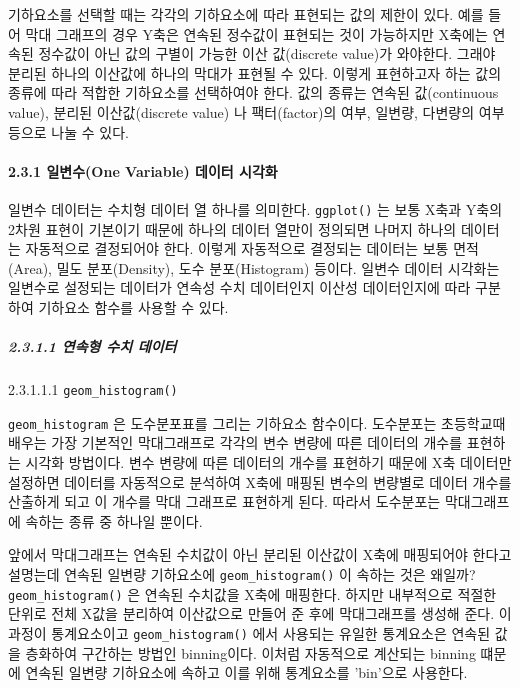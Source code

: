 \documentclass[
]{article}
\begin{document}
기하요소를 선택할 때는 각각의 기하요소에 따라 표현되는 값의 제한이 있다. 예를 들어 막대 그래프의 경우 Y축은 연속된 정수값이 표현되는 것이 가능하지만 X축에는 연속된 정수값이 아닌 값의 구별이 가능한 이산 값(discrete value)가 와야한다. 그래야 분리된 하나의 이산값에 하나의 막대가 표현될 수 있다. 이렇게 표현하고자 하는 값의 종류에 따라 적합한 기하요소를 선택하여야 한다. 값의 종류는 연속된 값(continuous value), 분리된 이산값(discrete value) 나 팩터(factor)의 여부, 일변량, 다변량의 여부 등으로 나눌 수 있다.

\hypertarget{uxc77cuxbcc0uxc218one-variable-uxb370uxc774uxd130-uxc2dcuxac01uxd654}{%
\paragraph{2.3.1 일변수(One Variable) 데이터 시각화}\label{uxc77cuxbcc0uxc218one-variable-uxb370uxc774uxd130-uxc2dcuxac01uxd654}}

일변수 데이터는 수치형 데이터 열 하나를 의미한다. \texttt{ggplot()} 는 보통 X축과 Y축의 2차원 표현이 기본이기 때문에 하나의 데이터 열만이 정의되면 나머지 하나의 데이터는 자동적으로 결정되어야 한다. 이렇게 자동적으로 결정되는 데이터는 보통 면적(Area), 밀도 분포(Density), 도수 분포(Histogram) 등이다. 일변수 데이터 시각화는 일변수로 설정되는 데이터가 연속성 수치 데이터인지 이산성 데이터인지에 따라 구분하여 기하요소 함수를 사용할 수 있다.

\hypertarget{uxc5f0uxc18duxd615-uxc218uxce58-uxb370uxc774uxd130}{%
\subparagraph{2.3.1.1 연속형 수치 데이터}\label{uxc5f0uxc18duxd615-uxc218uxce58-uxb370uxc774uxd130}}

2.3.1.1.1 \texttt{geom\_histogram()}

\texttt{geom\_histogram} 은 도수분포표를 그리는 기하요소 함수이다. 도수분포는 초등학교때 배우는 가장 기본적인 막대그래프로 각각의 변수 변량에 따른 데이터의 개수를 표현하는 시각화 방법이다. 변수 변량에 따른 데이터의 개수를 표현하기 때문에 X축 데이터만 설정하면 데이터를 자동적으로 분석하여 X축에 매핑된 변수의 변량별로 데이터 개수를 산출하게 되고 이 개수를 막대 그래프로 표현하게 된다. 따라서 도수분포는 막대그래프에 속하는 종류 중 하나일 뿐이다.

앞에서 막대그래프는 연속된 수치값이 아닌 분리된 이산값이 X축에 매핑되어야 한다고 설명는데 연속된 일변량 기하요소에 \texttt{geom\_histogram()} 이 속하는 것은 왜일까? \texttt{geom\_histogram()} 은 연속된 수치값을 X축에 매핑한다. 하지만 내부적으로 적절한 단위로 전체 X값을 분리하여 이산값으로 만들어 준 후에 막대그래프를 생성해 준다. 이 과정이 통계요소이고 \texttt{geom\_histogram()} 에서 사용되는 유일한 통계요소은 연속된 값을 층화하여 구간하는 방법인 binning이다. 이처럼 자동적으로 계산되는 binning 떄문에 연속된 일변량 기하요소에 속하고 이를 위해 통계요소를 'bin'으로 사용한다.
\end{document}
